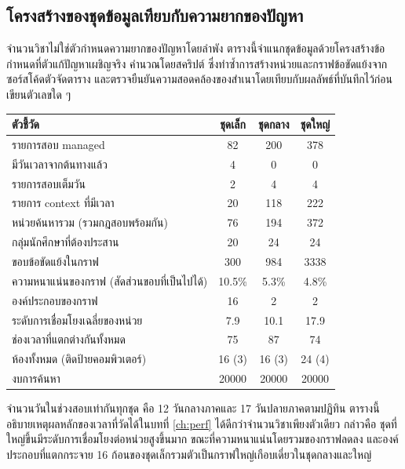 \documentclass[12pt,a4paper]{article}
\newcommand{\codebreaks}{\do\.\do\_\do\:\do\/\do\-\do\;}
\newcommand{\code}[1]{\bgroup\def\UrlBreaks{\codebreaks}\path{#1}\egroup}
\begin{document}
\subsection{โครงสร้างของชุดข้อมูลเทียบกับความยากของปัญหา}
จำนวนวิชาไม่ใช่ตัวกำหนดความยากของปัญหาโดยลำพัง ตารางนี้จำแนกชุดข้อมูลด้วยโครงสร้างข้อกำหนดที่ตัวแก้ปัญหาเผชิญจริง คำนวณโดยสคริปต์ \code{docs/data/fixture-stats.ts} ซึ่งทำซ้ำการสร้างหน่วยและกราฟข้อขัดแย้งจากซอร์สโค้ดตัวจัดตาราง และตรวจยืนยันความสอดคล้องของสำเนาโดยเทียบกับผลลัพธ์ที่บันทึกไว้ก่อนเขียนตัวเลขใด ๆ

\begin{center}\begin{minipage}{\textwidth}\centering
{}\label{tab:structure}
\begin{tabular}{L{5.4cm}ccc}\toprule
ตัวชี้วัด & ชุดเล็ก & ชุดกลาง & ชุดใหญ่ \\\midrule
รายการสอบ managed & 82 & 200 & 378 \\
มีวันเวลาจากต้นทางแล้ว & 4 & 0 & 0 \\
รายการสอบเต็มวัน & 2 & 4 & 4 \\
รายการ context ที่มีเวลา & 20 & 118 & 222 \\
หน่วยค้นหารวม (รวมกฎสอบพร้อมกัน) & 76 & 194 & 372 \\
กลุ่มนักศึกษาที่ต้องประสาน & 20 & 24 & 24 \\
ขอบข้อขัดแย้งในกราฟ & 300 & 984 & 3338 \\
ความหนาแน่นของกราฟ (สัดส่วนขอบที่เป็นไปได้) & 10.5\% & 5.3\% & 4.8\% \\
องค์ประกอบของกราฟ & 16 & 2 & 2 \\
ระดับการเชื่อมโยงเฉลี่ยของหน่วย & 7.9 & 10.1 & 17.9 \\
ช่องเวลาที่แตกต่างกันทั้งหมด & 75 & 87 & 74 \\
ห้องทั้งหมด (ติดป้ายคอมพิวเตอร์) & 16 (3) & 16 (3) & 24 (4) \\
งบการค้นหา & 20000 & 20000 & 20000 \\\bottomrule
\end{tabular}\end{minipage}\end{center}
จำนวนวันในช่วงสอบเท่ากันทุกชุด คือ 12 วันกลางภาคและ 17 วันปลายภาคตามปฏิทิน ตารางนี้อธิบายเหตุผลหลักของเวลาที่วัดได้ในบทที่ \ref{ch:perf} ได้ดีกว่าจำนวนวิชาเพียงตัวเดียว กล่าวคือ ชุดที่ใหญ่ขึ้นมีระดับการเชื่อมโยงต่อหน่วยสูงขึ้นมาก ขณะที่ความหนาแน่นโดยรวมของกราฟลดลง และองค์ประกอบที่แตกกระจาย 16 ก้อนของชุดเล็กรวมตัวเป็นกราฟใหญ่เกือบเดี่ยวในชุดกลางและใหญ่
\end{document}
